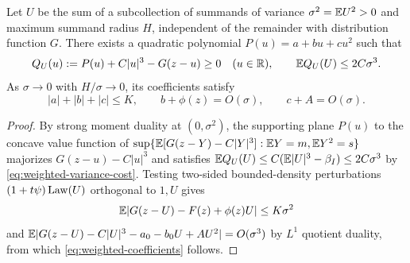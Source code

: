 \begin{lemma}\label{lem:weighted-majorant}
Let $U$ be the sum of a subcollection of summands of variance
$\sigma^2=\mathbb E U^2>0$ and maximum summand radius $H$, independent of the
remainder with distribution function $G$. There exists a quadratic polynomial
$P(u)=a+bu+cu^2$ such that
\begin{equation}\label{eq:weighted-majorant}
 Q_U(u):=P(u)+C|u|^3-G(z-u)\ge0\quad(u\in\mathbb R),\qquad
                        \mathbb E Q_U(U)\le2C\sigma^3.
\end{equation}
As $\sigma\to0$ with $H/\sigma\to0$, its coefficients satisfy
\begin{equation}\label{eq:weighted-coefficients}
 |a|+|b|+|c|\le K,\qquad b+\phi(z)=O(\sigma),\qquad c+A=O(\sigma).
\end{equation}
\end{lemma}
\begin{proof}
By strong moment duality at $(0,\sigma^2)$, the supporting plane $P(u)$ to
the concave value function of $\sup\{\mathbb E[G(z-Y)-C|Y|^3]:\mathbb E Y=m,\mathbb E Y^2=s\}$
majorizes $G(z-u)-C|u|^3$ and satisfies $\mathbb E Q_U(U)\le C(\mathbb E|U|^3-\beta_I)\le2C\sigma^3$
by \eqref{eq:weighted-variance-cost}. Testing two-sided bounded-density
perturbations $(1+t\psi)\operatorname{Law}(U)$ orthogonal to $1,U$ gives
\begin{equation}\label{eq:weighted-affine-deletion}
             \mathbb E|G(z-U)-F(z)+\phi(z)U|\le K\sigma^2
\end{equation}
and $\mathbb E|G(z-U)-C|U|^3-a_0-b_0U+AU^2|=O(\sigma^3)$ by $L^1$ quotient duality,
from which \eqref{eq:weighted-coefficients} follows.
\end{proof}

